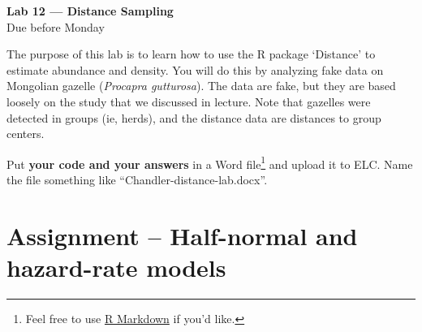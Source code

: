 \documentclass[12pt]{article}\usepackage[]{graphicx}\usepackage[]{color}
\begin{document}
{
  \Large
  \centering
  {\bf Lab 12 --- Distance Sampling \\ }
  Due before Monday \\
}

\vspace{24pt}

The purpose of this lab is to learn how to use the
R package `Distance' to estimate abundance and density. You will
do this by analyzing fake data on Mongolian gazelle ({\it Procapra
  gutturosa}). The data are fake, but they are based loosely on the
study that we discussed in lecture. Note that gazelles were detected
in groups (ie, herds), and the distance data are distances to group
centers. 

Put {\bf your code and your answers} in a Word file\footnote{Feel free
  to use \href{https://rmarkdown.rstudio.com/}{R Markdown} if you'd
  like.} and upload it to ELC. Name the file something like
``Chandler-distance-lab.docx''.



\section*{Assignment -- Half-normal and hazard-rate models}
\end{document}

